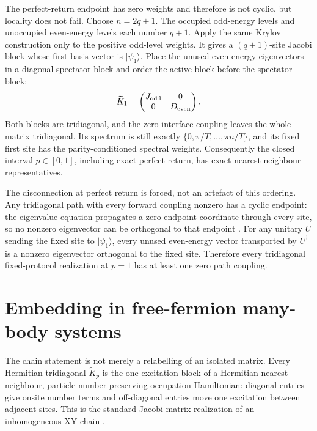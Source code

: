 \documentclass[12pt]{article}
\begin{document}
The perfect-return endpoint has zero weights and therefore is not cyclic,
but locality does not fail. Choose \(n=2q+1\). The occupied odd-energy
levels and unoccupied even-energy levels each number \(q+1\). Apply the
same Krylov construction only to the positive odd-level weights. It gives
a \((q+1)\)-site Jacobi block whose first basis vector is
\(|\psi_1\rangle\). Place the unused even-energy eigenvectors in a diagonal
spectator block and order the active block before the spectator block:
\begin{equation}
 \widetilde K_1=
 \begin{pmatrix}
   J_{\rm odd}&0\\
   0&D_{\rm even}
 \end{pmatrix}.
\label{eq:endpointblock}
\end{equation}
Both blocks are tridiagonal, and the zero interface coupling leaves the
whole matrix tridiagonal. Its spectrum is still exactly
\(\{0,\pi/T,\ldots,\pi n/T\}\), and its fixed first site has the
parity-conditioned spectral weights. Consequently the closed interval
\(p\in[0,1]\), including exact perfect return, has exact
nearest-neighbour representatives.

The disconnection at perfect return is forced, not an artefact of this
ordering. Any tridiagonal path with every forward coupling nonzero has a
cyclic endpoint: the eigenvalue equation propagates a zero endpoint
coordinate through every site, so no nonzero eigenvector can be orthogonal
to that endpoint \cite{Leite2005}. For any unitary \(U\) sending the fixed site to
\(\lvert\psi_1\rangle\), every unused even-energy vector transported by
\(U^\dagger\) is a nonzero eigenvector orthogonal to the fixed site.
Therefore every tridiagonal fixed-protocol realization at \(p=1\) has at
least one zero path coupling.

\section*{Embedding in free-fermion many-body systems}

The chain statement is not merely a relabelling of an isolated matrix.
Every Hermitian tridiagonal \(\widetilde K_p\) is the one-excitation block
of a Hermitian nearest-neighbour, particle-number-preserving occupation
Hamiltonian: diagonal entries give onsite number terms and off-diagonal
entries move one excitation between adjacent sites. This is the standard
Jacobi-matrix realization of an inhomogeneous XY chain
\cite{Chakrabarti2009,Bernard2025}.
\end{document}
